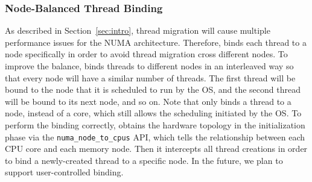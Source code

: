 \subsubsection{Node-Balanced Thread Binding} 
As described in Section~\ref{sec:intro}, thread migration will cause multiple performance issues for the NUMA architecture. Therefore, \NM{} binds each thread to a node specifically in order to avoid thread migration cross different nodes. To improve the balance, \NM{} binds threads to different nodes in an interleaved way so that every node will have a similar number of threads. The first thread will be bound to the node that it is scheduled to run by the OS, and the second thread will be bound to its next node, and so on. Note that \NM{} only binds a thread to a node, instead of a core, which still allows the scheduling initiated by the OS. To perform the binding correctly, \NM{} obtains the hardware topology in the initialization phase via the \texttt{numa\_node\_to\_cpus} API, which tells the relationship between each CPU core and each memory node. Then it intercepts all thread creations in order to bind a newly-created thread to a specific node. In the future, we plan to support user-controlled binding.



